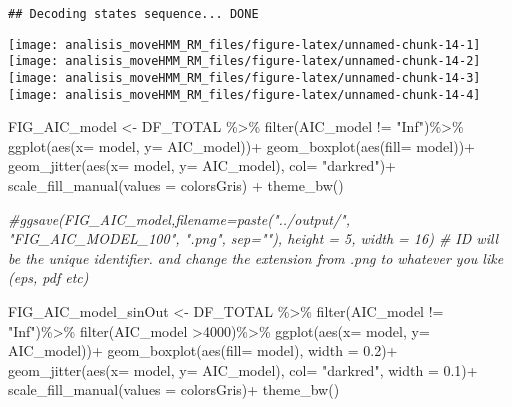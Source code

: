\documentclass[
]{article}
\newenvironment{Shaded}{\begin{snugshade}}{\end{snugshade}}
\newcommand{\AttributeTok}[1]{\textcolor[rgb]{0.77,0.63,0.00}{#1}}
\newcommand{\CommentTok}[1]{\textcolor[rgb]{0.56,0.35,0.01}{\textit{#1}}}
\newcommand{\DecValTok}[1]{\textcolor[rgb]{0.00,0.00,0.81}{#1}}
\newcommand{\FloatTok}[1]{\textcolor[rgb]{0.00,0.00,0.81}{#1}}
\newcommand{\FunctionTok}[1]{\textcolor[rgb]{0.00,0.00,0.00}{#1}}
\newcommand{\NormalTok}[1]{#1}
\newcommand{\OtherTok}[1]{\textcolor[rgb]{0.56,0.35,0.01}{#1}}
\newcommand{\SpecialCharTok}[1]{\textcolor[rgb]{0.00,0.00,0.00}{#1}}
\newcommand{\StringTok}[1]{\textcolor[rgb]{0.31,0.60,0.02}{#1}}
\begin{document}
\begin{verbatim}
## Decoding states sequence... DONE
\end{verbatim}

\texttt{[image: analisis\_moveHMM\_RM\_files/figure-latex/unnamed-chunk-14-1]}
\texttt{[image: analisis\_moveHMM\_RM\_files/figure-latex/unnamed-chunk-14-2]}
\texttt{[image: analisis\_moveHMM\_RM\_files/figure-latex/unnamed-chunk-14-3]}
\texttt{[image: analisis\_moveHMM\_RM\_files/figure-latex/unnamed-chunk-14-4]}

\begin{Shaded}
\begin{Highlighting}[]
\NormalTok{FIG\_AIC\_model }\OtherTok{\textless{}{-}}\NormalTok{ DF\_TOTAL }\SpecialCharTok{\%\textgreater{}\%} 
  \FunctionTok{filter}\NormalTok{(AIC\_model }\SpecialCharTok{!=} \StringTok{"Inf"}\NormalTok{)}\SpecialCharTok{\%\textgreater{}\%} 
  \FunctionTok{ggplot}\NormalTok{(}\FunctionTok{aes}\NormalTok{(}\AttributeTok{x=}\NormalTok{ model, }\AttributeTok{y=}\NormalTok{ AIC\_model))}\SpecialCharTok{+}
  \FunctionTok{geom\_boxplot}\NormalTok{(}\FunctionTok{aes}\NormalTok{(}\AttributeTok{fill=}\NormalTok{ model))}\SpecialCharTok{+}
  \FunctionTok{geom\_jitter}\NormalTok{(}\FunctionTok{aes}\NormalTok{(}\AttributeTok{x=}\NormalTok{ model, }\AttributeTok{y=}\NormalTok{ AIC\_model), }\AttributeTok{col=} \StringTok{"darkred"}\NormalTok{)}\SpecialCharTok{+}
  \FunctionTok{scale\_fill\_manual}\NormalTok{(}\AttributeTok{values =}\NormalTok{ colorsGris) }\SpecialCharTok{+}
  \FunctionTok{theme\_bw}\NormalTok{()}

\CommentTok{\#ggsave(FIG\_AIC\_model,filename=paste("../output/", "FIG\_AIC\_MODEL\_100", ".png", sep=""),  height = 5, width = 16) \# ID will be the unique identifier. and change the extension from .png to whatever you like (eps, pdf etc)}

\NormalTok{FIG\_AIC\_model\_sinOut }\OtherTok{\textless{}{-}}\NormalTok{ DF\_TOTAL }\SpecialCharTok{\%\textgreater{}\%} 
  \FunctionTok{filter}\NormalTok{(AIC\_model }\SpecialCharTok{!=} \StringTok{"Inf"}\NormalTok{)}\SpecialCharTok{\%\textgreater{}\%} 
  \FunctionTok{filter}\NormalTok{(AIC\_model }\SpecialCharTok{\textgreater{}}\DecValTok{4000}\NormalTok{)}\SpecialCharTok{\%\textgreater{}\%} 
  \FunctionTok{ggplot}\NormalTok{(}\FunctionTok{aes}\NormalTok{(}\AttributeTok{x=}\NormalTok{ model, }\AttributeTok{y=}\NormalTok{ AIC\_model))}\SpecialCharTok{+}
  \FunctionTok{geom\_boxplot}\NormalTok{(}\FunctionTok{aes}\NormalTok{(}\AttributeTok{fill=}\NormalTok{ model), }\AttributeTok{width =} \FloatTok{0.2}\NormalTok{)}\SpecialCharTok{+}
  \FunctionTok{geom\_jitter}\NormalTok{(}\FunctionTok{aes}\NormalTok{(}\AttributeTok{x=}\NormalTok{ model, }\AttributeTok{y=}\NormalTok{ AIC\_model), }\AttributeTok{col=} \StringTok{"darkred"}\NormalTok{, }\AttributeTok{width =} \FloatTok{0.1}\NormalTok{)}\SpecialCharTok{+}
  \FunctionTok{scale\_fill\_manual}\NormalTok{(}\AttributeTok{values =}\NormalTok{ colorsGris)}\SpecialCharTok{+}
  \FunctionTok{theme\_bw}\NormalTok{()}


\end{Highlighting}
\end{Shaded}
\end{document}
